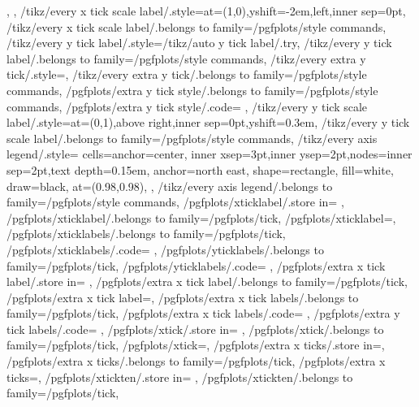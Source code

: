 {{		,
	},
	/tikz/every x tick scale label/.style={at={(1,0)},yshift=-2em,left,inner sep=0pt},
	/tikz/every x tick scale label/.belongs to family=/pgfplots/style commands,
	/tikz/every y tick label/.style={/tikz/auto y tick label/.try},
	/tikz/every y tick label/.belongs to family=/pgfplots/style commands,
	/tikz/every extra y tick/.style={},
	/tikz/every extra y tick/.belongs to family=/pgfplots/style commands,
	/pgfplots/extra y tick style/.belongs to family=/pgfplots/style commands,
	/pgfplots/extra y tick style/.code={%
	},
	/tikz/every y tick scale label/.style={at={(0,1)},above right,inner sep=0pt,yshift=0.3em},
	/tikz/every y tick scale label/.belongs to family=/pgfplots/style commands,
	/tikz/every axis legend/.style={%
		cells={anchor=center},
		inner xsep=3pt,inner ysep=2pt,nodes={inner sep=2pt,text depth=0.15em},
		anchor=north east,%
		shape=rectangle,%
		fill=white,%
		draw=black,
		at={(0.98,0.98)},
	},
	/tikz/every axis legend/.belongs to family=/pgfplots/style commands,
	/pgfplots/xticklabel/.store in=	\pgfplots@xticklabel,
	/pgfplots/xticklabel/.belongs to family=/pgfplots/tick,
	/pgfplots/xticklabel=,
	/pgfplots/xticklabels/.belongs to family=/pgfplots/tick,
	/pgfplots/xticklabels/.code={%
		\to\pgfplots@xticklabels
		\let\pgfplots@xticklabel=\pgfplots@user@ticklabel@list@x
	},
	/pgfplots/yticklabels/.belongs to family=/pgfplots/tick,
	/pgfplots/yticklabels/.code={%
		\to\pgfplots@yticklabels
		\let\pgfplots@yticklabel=\pgfplots@user@ticklabel@list@y
	},
	/pgfplots/extra x tick label/.store in=	\pgfplots@extra@xticklabel,
	/pgfplots/extra x tick label/.belongs to family=/pgfplots/tick,
	/pgfplots/extra x tick label=,
	/pgfplots/extra x tick labels/.belongs to family=/pgfplots/tick,
	/pgfplots/extra x tick labels/.code={%
		\to\pgfplots@extra@xticklabels
		\let\pgfplots@extra@xticklabel=\pgfplots@user@extra@ticklabel@list@x
	},
	/pgfplots/extra y tick labels/.code={%
		\to\pgfplots@extra@yticklabels
		\let\pgfplots@extra@yticklabel=\pgfplots@user@extra@ticklabel@list@y
	},
	/pgfplots/xtick/.store in=			\pgfplots@xtick,
	/pgfplots/xtick/.belongs to family=/pgfplots/tick,
	/pgfplots/xtick=,
	/pgfplots/extra x ticks/.store in=\pgfplots@extra@xtick,
	/pgfplots/extra x ticks/.belongs to family=/pgfplots/tick,
	/pgfplots/extra x ticks=,
	/pgfplots/xtickten/.store in=		\pgfplots@xtickten,
	/pgfplots/xtickten/.belongs to family=/pgfplots/tick,
}
